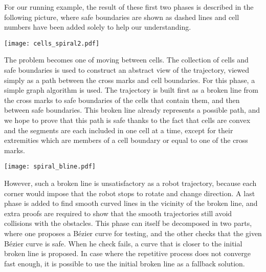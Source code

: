 \documentclass{easychair}
\begin{document}
For our running example, the result of these first two phases is
described in the following picture, where safe boundaries are shown as
dashed lines and cell numbers have been added solely to help our
understanding.
\begin{center}
\texttt{[image: cells\_spiral2.pdf]}
\end{center}
The problem becomes one of moving between cells. The collection of cells and
safe boundaries is used to
construct an abstract view of the trajectory, viewed simply as a path
between the cross marks and cell boundaries.  For this phase, a simple
graph algorithm is
used.  The trajectory is built first as a broken line from the
cross marks to safe boundaries of the cells that contain them, and then
between safe boundaries.  This broken line already represents a possible
path, and we hope to prove that this path is safe thanks to the fact
that cells are convex and the segments are each included in one
cell at a time, except for their extremities which are members of a cell
boundary or equal to one of the cross marks.
\begin{center}
\texttt{[image: spiral\_bline.pdf]}
\end{center}
However, such a broken line is unsatisfactory
as a robot trajectory, because each corner would impose that the robot
stops to rotate and change direction.  A last phase is added to find
smooth curved lines in the vicinity of the broken line, and extra proofs are
required to show that the smooth trajectories still avoid collisions with
the obstacles.  This phase can itself be decomposed in two parts, where one
proposes a Bézier curve for testing, and the other checks that the given
Bézier curve is safe.  When he check fails, a curve that is closer
to the initial broken line is proposed.  In case where the repetitive process
does not converge fast enough, it is possible to use the initial broken line as
a fallback solution.
\end{document}
